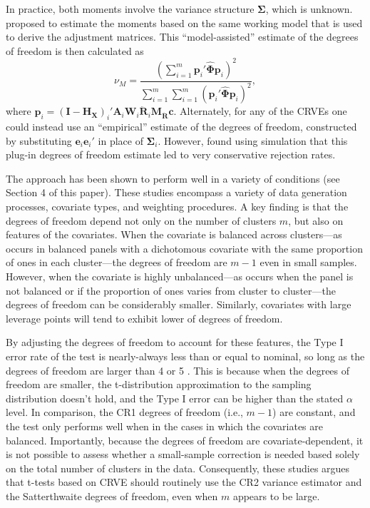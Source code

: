 \documentclass[12pt]{article}\usepackage[]{graphicx}\usepackage[]{color}
\newcommand{\bm}{\mathbf}
\newcommand{\bs}{\boldsymbol}
\begin{document}
In practice, both moments involve the variance structure $\bs\Sigma$, which is unknown. 
\citet{Bell2002bias} proposed to estimate the moments based on the same working model that is used to derive the adjustment matrices. 
This ``model-assisted'' estimate of the degrees of freedom is then calculated as 
\begin{equation}
\label{eq:nu_model}
\nu_{M} = \frac{\left(\sum_{i=1}^m \bm{p}_i' \hat{\bs\Phi} \bm{p}_i\right)^2}{\sum_{i=1}^m \sum_{i=1}^m \left(\bm{p}_i' \hat{\bs\Phi} \bm{p}_i\right)^2},
\end{equation}
where $\bm{p}_i = \left(\bm{I} - \bm{H_X}\right)_i'\bm{A}_i \bm{W}_i\bm{\ddot{R}}_i\bm{M_{\ddot{R}}} \bm{c}$.
Alternately, for any of the CRVEs one could instead use an ``empirical'' estimate of the degrees of freedom, constructed by substituting $\bm{e}_i \bm{e}_i'$ in place of $\bs\Sigma_i$. 
However, \citet{Bell2002bias} found using simulation that this plug-in degrees of freedom estimate led to very conservative rejection rates. 

The \citet{Bell2002bias} approach has been shown to perform well in a variety of conditions (see Section 4 of this paper). 
These studies encompass a variety of data generation processes, covariate types, and weighting procedures. 
A key finding is that the degrees of freedom depend not only on the number of clusters $m$, but also on features of the covariates. 
When the covariate is balanced across clusters---as occurs in balanced panels with a dichotomous covariate with the same proportion of ones in each cluster---the degrees of freedom are $m - 1$ even in small samples. 
However, when the covariate is highly unbalanced---as occurs when the panel is not balanced or if the proportion of ones varies from cluster to cluster---the degrees of freedom can be considerably smaller. 
Similarly, covariates with large leverage points will tend to exhibit lower of degrees of freedom. 

By adjusting the degrees of freedom to account for these features, the Type I error rate of the test is nearly-always less than or equal to nominal, so long as the degrees of freedom are larger than 4 or 5 \citep{Bell2002bias, Tipton2015small-t}.
This is because when the degrees of freedom are smaller, the t-distribution approximation to the sampling distribution doesn't hold, and the Type I error can be higher than the stated $\alpha$ level.
In comparison, the CR1 degrees of freedom (i.e., $m - 1$) are constant, and the test only performs well when in the cases in which the covariates are balanced.
Importantly, because the degrees of freedom are covariate-dependent, it is not possible to assess whether a small-sample correction is needed based solely on the total number of clusters in the data. 
Consequently, these studies argues that t-tests based on CRVE should routinely use the CR2 variance estimator and the Satterthwaite degrees of freedom, even when $m$ appears to be large.
\end{document}
